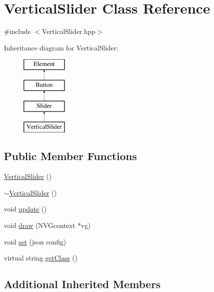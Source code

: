 \hypertarget{class_vertical_slider}{}\section{Vertical\+Slider Class Reference}
\label{class_vertical_slider}


{\ttfamily \#include $<$Vertical\+Slider.\+hpp$>$}

Inheritance diagram for Vertical\+Slider\+:\begin{figure}[H]
\begin{center}
\leavevmode
\includegraphics[height=4.000000cm]{class_vertical_slider}
\end{center}
\end{figure}
\subsection*{Public Member Functions}
\begin{DoxyCompactItemize}
\item 
\hyperlink{class_vertical_slider_af83ca315bf665ac96d29df5c4e32ecc0}{Vertical\+Slider} ()
\item 
\hyperlink{class_vertical_slider_ace98a29d39b256e37628334c2cc69822}{$\sim$\+Vertical\+Slider} ()
\item 
void \hyperlink{class_vertical_slider_ae868b87e37fbdac6e4906ac6b9ad465d}{update} ()
\item 
void \hyperlink{class_vertical_slider_a6a5ab2800438817cc5a97c475fad9f2f}{draw} (N\+V\+Gcontext $\ast$vg)
\item 
void \hyperlink{class_vertical_slider_a35b7771bd63647aa288f16719611b567}{set} (json config)
\item 
virtual string \hyperlink{class_vertical_slider_a5e13fb542bdca4cca91f96ca15b28fad}{get\+Class} ()
\end{DoxyCompactItemize}
\subsection*{Additional Inherited Members}



